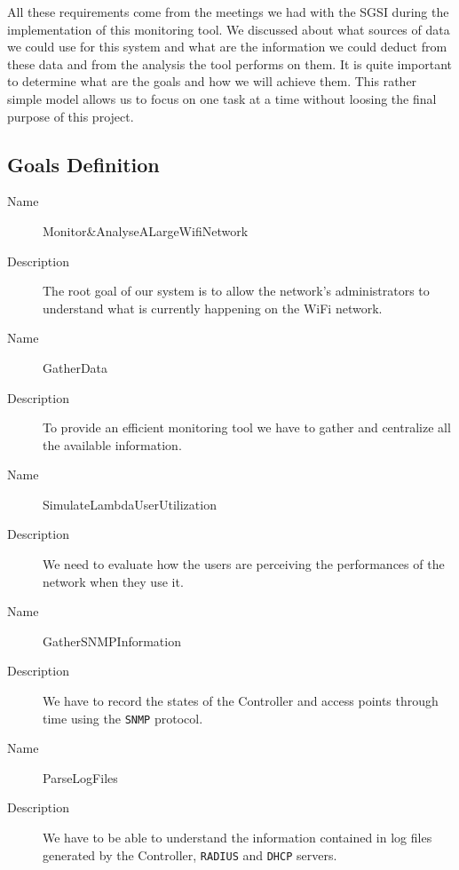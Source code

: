 All these requirements come from the meetings we had with the SGSI during the implementation of this monitoring tool. We discussed about what sources of data we could use for this system and what are the information we could deduct from these data and from the analysis the tool performs on them. It is quite important to determine what are the goals and how we will achieve them. This rather simple model allows us to focus on one task at a time without loosing the final purpose of this project.

\subsection{Goals Definition}
\begin{description}
  \item[Name] Monitor\&AnalyseALargeWifiNetwork
  \item[Description] The root goal of our system is to allow the network's administrators to understand what is currently happening on the WiFi network.
\end{description}

\begin{description}
  \item[Name] GatherData
  \item[Description] To provide an efficient monitoring tool we have to gather and centralize all the available information. 
\end{description}

\begin{description}
  \item[Name] SimulateLambdaUserUtilization
  \item[Description] We need to evaluate how the users are perceiving the performances of the network when they use it.
\end{description}

\begin{description}
  \item[Name] GatherSNMPInformation
  \item[Description] We have to record the states of the Controller and access points through time using the \texttt{SNMP} protocol.
\end{description}

\begin{description}
  \item[Name] ParseLogFiles
  \item[Description] We have to be able to understand the information contained in log files generated by the Controller, \texttt{RADIUS} and \texttt{DHCP} servers.
\end{description}

